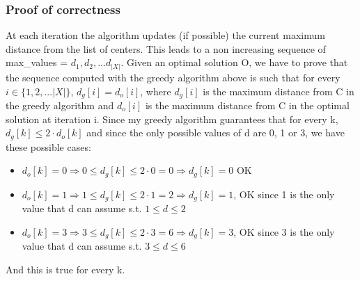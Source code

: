 \subsubsection{Proof of correctness}
At each iteration the algorithm updates (if possible) the current maximum distance from the list of centers. This leads to a non increasing sequence of max\_values = ${d_1, d_2, ... d_{|X|}}$. Given an optimal solution O, we have to prove that the sequence computed with the greedy algorithm above is such that for every $i \in \{1, 2, ... |X|\}$, $d_g[i] = d_o[i] $, where $d_g[i]$ is the maximum distance from C in the greedy algorithm and $d_o[i]$ is the maximum distance from C in the optimal solution at iteration i. Since my greedy algorithm guarantees that for every k, $d_g[k] \leq 2 \cdot d_o[k]$ and since the only possible values of d are 0, 1 or 3, we have these possible cases:
\begin{itemize}
	\item $d_o[k] = 0 \Rightarrow  0 \leq d_g[k] \leq 2\cdot0 = 0 \Rightarrow d_g[k] = 0$ OK
	\item $d_o[k] = 1 \Rightarrow  1 \leq d_g[k] \leq 2\cdot1 = 2 \Rightarrow d_g[k] = 1 $, OK since 1 is the only value that d can assume s.t. $1 \leq d \leq 2$
	\item $d_o[k] = 3 \Rightarrow  3 \leq d_g[k] \leq 2\cdot3 = 6 \Rightarrow d_g[k] = 3 $, OK since 3 is the only value that d can assume s.t. $3 \leq d \leq 6$
\end{itemize}
And this is true for every k.